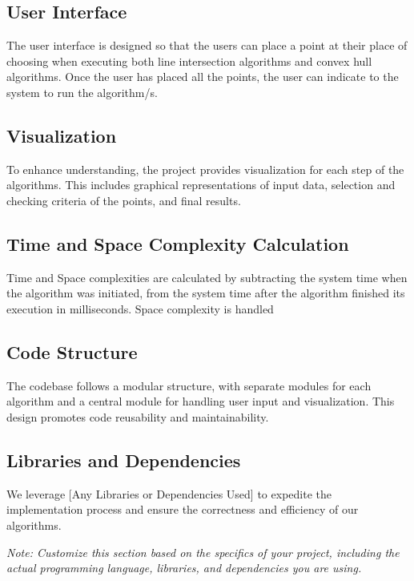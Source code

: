 \documentclass[10pt,twocolumn]{article}
\begin{document}
\subsection*{User Interface}

The user interface is designed so that the users can place a point at their place of choosing when executing both line intersection algorithms
and convex hull algorithms. Once the user has placed all the points, the user can indicate to the system to run the algorithm/s.

\subsection*{Visualization}

To enhance understanding, the project provides visualization for each step of the algorithms. This includes graphical representations of input
data, selection and checking criteria of the points, and final results.

\subsection*{Time and Space Complexity Calculation}

Time and Space complexities are calculated by subtracting the system time when the algorithm was initiated, from the system time
after the algorithm finished its execution in milliseconds. Space complexity is handled 

\subsection*{Code Structure}

The codebase follows a modular structure, with separate modules for each algorithm and a central module for handling user input and visualization. This design promotes code reusability and maintainability.

\subsection*{Libraries and Dependencies}

We leverage [Any Libraries or Dependencies Used] to expedite the implementation process and ensure the correctness and efficiency of our algorithms.

\emph{Note: Customize this section based on the specifics of your project, including the actual programming language, libraries, and dependencies you are using.}
\end{document}
